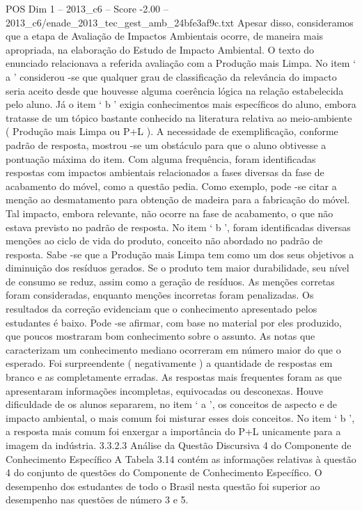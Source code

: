 \begin{textsample}{POS Dim 1 – 2013\_c6 – Score -2.00 – 2013\_c6/enade\_2013\_tec\_gest\_amb\_24bfe3af9c.txt}
Apesar disso, consideramos que a etapa de Avaliação de Impactos Ambientais ocorre, de maneira mais apropriada, na elaboração do Estudo de Impacto Ambiental.
O texto do enunciado relacionava a referida avaliação com a Produção mais Limpa.
No item ‘ a ’ considerou -se que qualquer grau de classificação da relevância do impacto seria aceito desde que houvesse alguma coerência lógica na relação estabelecida pelo aluno.
Já o item ‘ b ’ exigia conhecimentos mais específicos do aluno, embora tratasse de um tópico bastante conhecido na literatura relativa ao meio-ambiente ( Produção mais Limpa ou P+L ).
A necessidade de exemplificação, conforme padrão de resposta, mostrou -se um obstáculo para que o aluno obtivesse a pontuação máxima do item.
Com alguma frequência, foram identificadas respostas com impactos ambientais relacionados a fases diversas da fase de acabamento do móvel, como a questão pedia.
Como exemplo, pode -se citar a menção ao desmatamento para obtenção de madeira para a fabricação do móvel.
Tal impacto, embora relevante, não ocorre na fase de acabamento, o que não estava previsto no padrão de resposta.
No item ‘ b ’, foram identificadas diversas menções ao ciclo de vida do produto, conceito não abordado no padrão de resposta.
Sabe -se que a Produção mais Limpa tem como um dos seus objetivos a diminuição dos resíduos gerados.
Se o produto tem maior durabilidade, seu nível de consumo se reduz, assim como a geração de resíduos.
As menções corretas foram consideradas, enquanto menções incorretas foram penalizadas.
Os resultados da correção evidenciam que o conhecimento apresentado pelos estudantes é baixo.
Pode -se afirmar, com base no material por eles produzido, que poucos mostraram bom conhecimento sobre o assunto.
As notas que caracterizam um conhecimento mediano ocorreram em número maior do que o esperado.
Foi surpreendente ( negativamente ) a quantidade de respostas em branco e as completamente erradas.
As respostas mais frequentes foram as que apresentaram informações incompletas, equivocadas ou desconexas.
Houve dificuldade de os alunos separarem, no item ‘ a ’, os conceitos de aspecto e de impacto ambiental, o mais comum foi misturar esses dois conceitos.
No item ‘ b ’, a resposta mais comum foi enxergar a importância do P+L unicamente para a imagem da indústria. 3.3.2.3 Análise da Questão Discursiva 4 do Componente de Conhecimento Específico A Tabela 3.14 contém as informações relativas à questão 4 do conjunto de questões do Componente de Conhecimento Específico.
O desempenho dos estudantes de todo o Brasil nesta questão foi superior ao desempenho nas questões de número 3 e 5.

\end{textsample}
